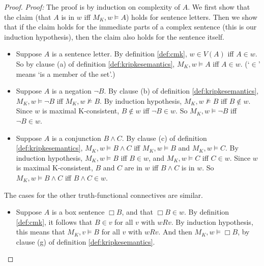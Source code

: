 \begin{proof}
  \emph{Proof:} The proof is by induction on complexity of $A$. We first show
  that the claim (that $A$ is in $w$ iff $M_{K},w\models A$) holds for sentence
  letters. Then we show that if the claim holds for the immediate parts of a
  complex sentence (this is our induction hypothesis), then the claim also
  holds for the sentence itself.%
  \vspace{-1mm}
  \begin{itemize}
    \itemsep0mm
    \item Suppose $A$ is a sentence letter. By definition \ref{def:cmk},
          $w\in V(A)$ iff $A\in w$. So by clause (a) of definition
          \ref{def:kripkesemantics}, $M_K,w \models A$ iff $A \in w$. (`$\in$'
          means `is a member of the set'.)
  
    \item Suppose $A$ is a negation $\neg B$. By clause (b) of definition
          \ref{def:kripkesemantics}, $M_K,w \models \neg B$ iff
          $M_K,w \not\models B$. By induction hypothesis, $M_K,w\not\models B$
          iff $B \not\in w$. Since $w$ is maximal K-consistent, $B \not\in w$
          iff $\neg B \in w$. So $M_K,w \models \neg B$ iff $\neg B \in w$.
        
    \item Suppose $A$ is a conjunction $B\land C$. By clause (c) of definition
          \ref{def:kripkesemantics}, $M_K,w \models B\land C$ iff
          $M_K,w \models B$ and $M_K,w \models C$. By induction hypothesis,
          $M_K,w \models B$ iff $B\in w$, and $M_K,w \models C$ iff $C\in w$.
          Since $w$ is maximal K-consistent, $B$ and $C$ are in $w$ iff
          $B\land C$ is in $w$.
          So $M_K,w \models B \land C$ iff $B \land C \in w$.
  \end{itemize}
  The cases for the other truth-functional connectives are similar.
  \begin{itemize}
    \itemsep0mm
    \item Suppose $A$ is a box sentence $\Box B$, and that $\Box B \in w$. By
          definition \ref{def:cmk}, it follows that $B\in v$ for all $v$ with
          $wRv$. By induction hypothesis, this means that $M_K,v \models B$ for
          all $v$ with $wRv$. And then $M_K,w \models \Box B$, by clause (g) of
          definition \ref{def:kripkesemantics}.


\end{itemize}
\end{proof}
